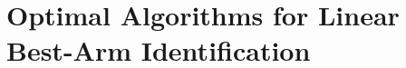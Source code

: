 
\chapter{Optimal Algorithms for Linear Best-Arm Identification}\label{CHAP:LGC}
	\minitoc
	\newpage




















% 
% 
